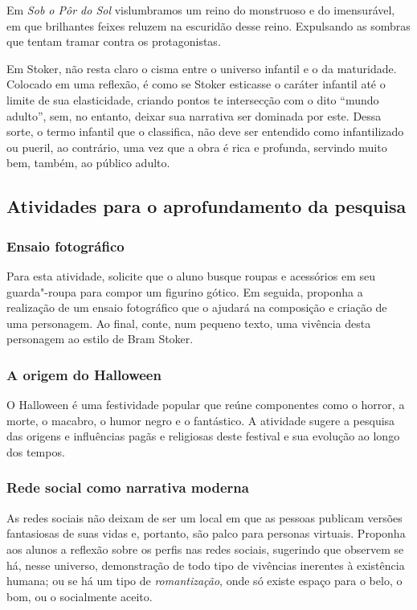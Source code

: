 \documentclass[12pt]{extarticle}
\begin{document}
Em \emph{Sob o Pôr do Sol} vislumbramos um reino do monstruoso e do
imensurável, em que brilhantes feixes reluzem na escuridão desse reino.
Expulsando as sombras que tentam tramar contra os protagonistas.

Em Stoker, não resta claro o cisma entre o universo infantil e o da
maturidade. Colocado em uma reflexão, é como se Stoker esticasse o
caráter infantil até o limite de sua elasticidade, criando pontos te
intersecção com o dito ``mundo adulto'', sem, no entanto, deixar sua
narrativa ser dominada por este. Dessa sorte, o termo infantil que o
classifica, não deve ser entendido como infantilizado ou pueril, ao
contrário, uma vez que a obra é rica e profunda, servindo muito bem,
também, ao público adulto.

\subsection{Atividades para o aprofundamento da pesquisa}

\subsubsection{Ensaio fotográfico}

Para esta atividade, solicite que o aluno busque roupas e acessórios
em seu guarda"-roupa para compor um figurino gótico. Em seguida,
proponha a realização de um ensaio fotográfico que o ajudará na
composição e criação de uma personagem. Ao final, conte, num pequeno
texto, uma vivência desta personagem ao estilo de Bram Stoker.

\subsubsection{A origem do Halloween}

O Halloween é uma festividade popular que reúne componentes como o
horror, a morte, o macabro, o humor negro e o fantástico. A atividade
sugere a pesquisa das origens e influências pagãs e religiosas deste
festival e sua evolução ao longo dos tempos.

\subsubsection{Rede social como narrativa moderna}
As redes sociais não deixam de ser um local em que as pessoas publicam
versões fantasiosas de suas vidas e, portanto, são palco para personas
virtuais. Proponha aos alunos a reflexão sobre os perfis nas redes
sociais, sugerindo que observem se há, nesse universo, demonstração de
todo tipo de vivências inerentes à existência humana; ou se há um tipo
de \emph{romantização}, onde só existe espaço para o belo, o bom, ou o
socialmente aceito. 
\end{document}
